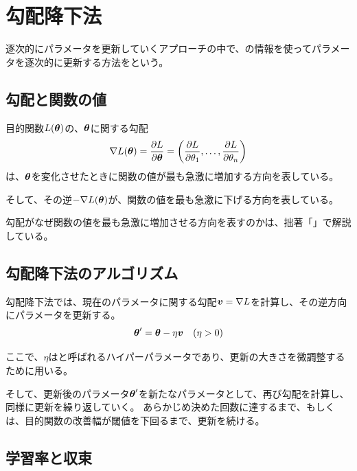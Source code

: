 \documentclass[../../../topic_machine-learning]{subfiles}
\begin{document}
\sectionline
\section{勾配降下法}

逐次的にパラメータを更新していくアプローチの中で、の情報を使ってパラメータを逐次的に更新する方法をという。

\subsection{勾配と関数の値}

目的関数$L(\vb*{\theta})$の、$\vb*{\theta}$に関する勾配
\begin{equation*}
  \nabla L(\vb*{\theta}) = \frac{\partial L}{\partial \vb*{\theta}} = \left( \frac{\partial L}{\partial \theta_1}, \ldots, \frac{\partial L}{\partial \theta_n} \right)
\end{equation*}
は、$\vb*{\theta}$を変化させたときに関数の値が最も急激に増加する方向を表している。

そして、その逆$-\nabla L(\vb*{\theta})$が、関数の値を最も急激に下げる方向を表している。

\begin{supplnote}
  勾配がなぜ関数の値を最も急激に増加させる方向を表すのかは、拙著「\webbookA」で解説している。
\end{supplnote}

\subsection{勾配降下法のアルゴリズム}

勾配降下法では、現在のパラメータに関する勾配$\vb*{v} = \nabla L$を計算し、その逆方向にパラメータを更新する。
\begin{equation*}
  \vb*{\theta}' = \vb*{\theta} - \eta \vb*{v} \quad (\eta > 0)
\end{equation*}

ここで、$\eta$はと呼ばれるハイパーパラメータであり、更新の大きさを微調整するために用いる。

\br

そして、更新後のパラメータ$\vb*{\theta}'$を新たなパラメータとして、再び勾配を計算し、同様に更新を繰り返していく。
あらかじめ決めた回数に達するまで、もしくは、目的関数の改善幅が閾値を下回るまで、更新を続ける。

\subsection{学習率と収束}
\end{document}
